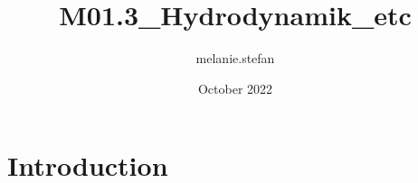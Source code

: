 \documentclass{article}
\title{M01.3_Hydrodynamik_etc}
\author{melanie.stefan }
\date{October 2022}
\begin{document}
\maketitle

\section{Introduction}
\end{document}
